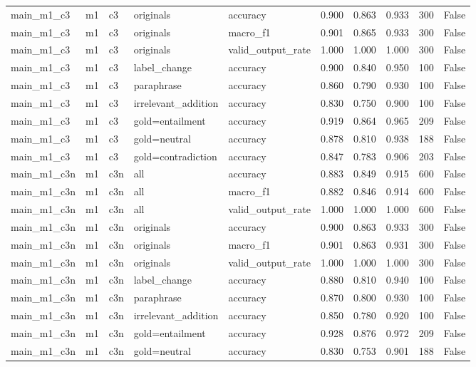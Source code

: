 \begin{tabular}{llllllllll}
main\_m1\_c3 & m1 & c3 & originals & accuracy & 0.900 & 0.863 & 0.933 & 300 & False \\
main\_m1\_c3 & m1 & c3 & originals & macro\_f1 & 0.901 & 0.865 & 0.933 & 300 & False \\
main\_m1\_c3 & m1 & c3 & originals & valid\_output\_rate & 1.000 & 1.000 & 1.000 & 300 & False \\
main\_m1\_c3 & m1 & c3 & label\_change & accuracy & 0.900 & 0.840 & 0.950 & 100 & False \\
main\_m1\_c3 & m1 & c3 & paraphrase & accuracy & 0.860 & 0.790 & 0.930 & 100 & False \\
main\_m1\_c3 & m1 & c3 & irrelevant\_addition & accuracy & 0.830 & 0.750 & 0.900 & 100 & False \\
main\_m1\_c3 & m1 & c3 & gold=entailment & accuracy & 0.919 & 0.864 & 0.965 & 209 & False \\
main\_m1\_c3 & m1 & c3 & gold=neutral & accuracy & 0.878 & 0.810 & 0.938 & 188 & False \\
main\_m1\_c3 & m1 & c3 & gold=contradiction & accuracy & 0.847 & 0.783 & 0.906 & 203 & False \\
main\_m1\_c3n & m1 & c3n & all & accuracy & 0.883 & 0.849 & 0.915 & 600 & False \\
main\_m1\_c3n & m1 & c3n & all & macro\_f1 & 0.882 & 0.846 & 0.914 & 600 & False \\
main\_m1\_c3n & m1 & c3n & all & valid\_output\_rate & 1.000 & 1.000 & 1.000 & 600 & False \\
main\_m1\_c3n & m1 & c3n & originals & accuracy & 0.900 & 0.863 & 0.933 & 300 & False \\
main\_m1\_c3n & m1 & c3n & originals & macro\_f1 & 0.901 & 0.863 & 0.931 & 300 & False \\
main\_m1\_c3n & m1 & c3n & originals & valid\_output\_rate & 1.000 & 1.000 & 1.000 & 300 & False \\
main\_m1\_c3n & m1 & c3n & label\_change & accuracy & 0.880 & 0.810 & 0.940 & 100 & False \\
main\_m1\_c3n & m1 & c3n & paraphrase & accuracy & 0.870 & 0.800 & 0.930 & 100 & False \\
main\_m1\_c3n & m1 & c3n & irrelevant\_addition & accuracy & 0.850 & 0.780 & 0.920 & 100 & False \\
main\_m1\_c3n & m1 & c3n & gold=entailment & accuracy & 0.928 & 0.876 & 0.972 & 209 & False \\
main\_m1\_c3n & m1 & c3n & gold=neutral & accuracy & 0.830 & 0.753 & 0.901 & 188 & False \\

\end{tabular}

